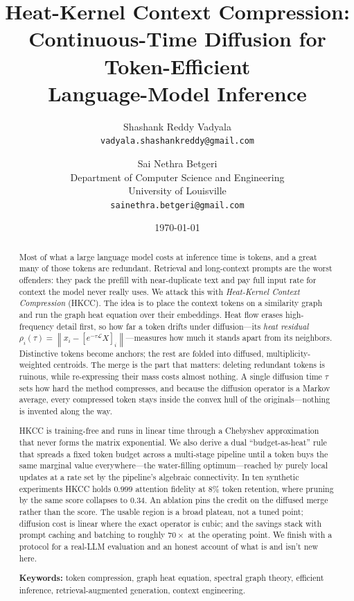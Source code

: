 \documentclass[11pt]{article}
\title{\bf Heat-Kernel Context Compression:\\
Continuous-Time Diffusion for Token-Efficient\\ Language-Model Inference}
\author{
Shashank Reddy Vadyala\\
\texttt{vadyala.shashankreddy@gmail.com}
\and
Sai Nethra Betgeri\\
Department of Computer Science and Engineering\\
University of Louisville\\
\texttt{sainethra.betgeri@gmail.com}
}
\date{\today}
\newcommand{\rwL}{\mathcal{L}}
\newcommand{\norm}[1]{\left\lVert#1\right\rVert}
\begin{document}
\maketitle

\begin{abstract}
\noindent
Most of what a large language model costs at inference time is tokens, and a great many of
those tokens are redundant. Retrieval and long-context prompts are the worst offenders: they
pack the prefill with near-duplicate text and pay full input rate for context the model never
really uses. We attack this with \emph{Heat-Kernel Context Compression} (HKCC). The idea is to
place the context tokens on a similarity graph and run the graph heat equation over their
embeddings. Heat flow erases high-frequency detail first, so how far a token drifts under
diffusion---its \emph{heat residual} $\rho_i(\tau)=\norm{x_i-[e^{-\tau\rwL}X]_i}$---measures how
much it stands apart from its neighbors. Distinctive tokens become anchors; the rest are folded
into diffused, multiplicity-weighted centroids. The merge is the part that matters: deleting
redundant tokens is ruinous, while re-expressing their mass costs almost nothing. A single
diffusion time $\tau$ sets how hard the method compresses, and because the diffusion operator is
a Markov average, every compressed token stays inside the convex hull of the originals---nothing
is invented along the way.

HKCC is training-free and runs in linear time through a Chebyshev approximation that never forms
the matrix exponential. We also derive a dual ``budget-as-heat'' rule that spreads a fixed token
budget across a multi-stage pipeline until a token buys the same marginal value everywhere---the
water-filling optimum---reached by purely local updates at a rate set by the pipeline's algebraic
connectivity. In ten synthetic experiments HKCC holds $0.999$ attention fidelity at $8\%$ token
retention, where pruning by the same score collapses to $0.34$. An ablation pins the credit on the
diffused merge rather than the score. The usable region is a broad plateau, not a tuned point;
diffusion cost is linear where the exact operator is cubic; and the savings stack with prompt
caching and batching to roughly $70\times$ at the operating point. We finish with a protocol for a
real-LLM evaluation and an honest account of what is and isn't new here.

\medskip
\noindent\textbf{Keywords:} token compression, graph heat equation, spectral graph theory,
efficient inference, retrieval-augmented generation, context engineering.
\end{abstract}
\end{document}
